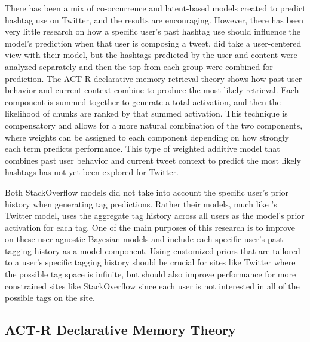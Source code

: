 \documentclass[man,floatsintext,donotrepeattitle]{apa6}
\begin{document}
There has been a mix of co-occurrence and latent-based models created to predict hashtag use on Twitter, and the results are encouraging.
However, there has been very little research on how a specific user's past hashtag use should influence the model's prediction when that user is composing a tweet.
\textcite{Kywe2012} did take a user-centered view with their model, but the hashtags predicted by the user and content were analyzed separately and then the top from each group were combined for prediction.
The ACT-R declarative memory retrieval theory shows how past user behavior and current context combine to produce the most likely retrieval.
Each component is summed together to generate a total activation, and then the likelihood of chunks are ranked by that summed activation.
This technique is compensatory and allows for a more natural combination of the two components, where weights can be assigned to each component depending on how strongly each term predicts performance.
This type of weighted additive model that combines past user behavior and current tweet context to predict the most likely hashtags has not yet been explored for Twitter.

Both StackOverflow models \parencites{Stanley2013,Kuo2011} did not take into account the specific user's prior history when generating tag predictions.
Rather their models, much like \textcite{Mazzia2009}'s Twitter model, uses the aggregate tag history across all users as the model's prior activation for each tag.
One of the main purposes of this research is to improve on these user-agnostic Bayesian models and include each specific user's past tagging history as a model component.
Using customized priors that are tailored to a user's specific tagging history should be crucial for sites like Twitter where the possible tag space is infinite,
but should also improve performance for more constrained sites like StackOverflow since each user is not interested in all of the possible tags on the site. 

\subsection{ACT-R Declarative Memory Theory}
\end{document}
